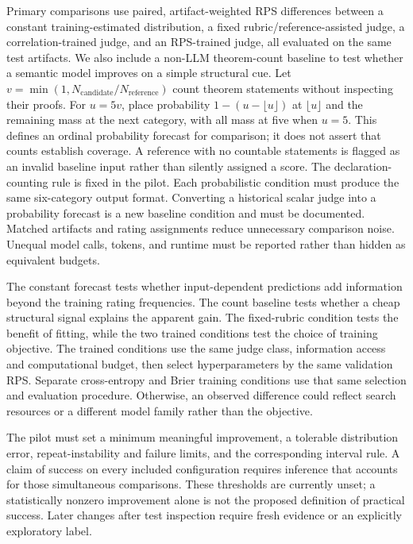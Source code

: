 Primary comparisons use paired, artifact-weighted RPS differences between a constant training-estimated distribution, a fixed rubric/reference-assisted judge, a correlation-trained judge, and an RPS-trained judge, all evaluated on the same test artifacts.
We also include a non-LLM theorem-count baseline to test whether a semantic model improves on a simple structural cue.
Let $v=\min(1,N_{\mathrm{candidate}}/N_{\mathrm{reference}})$ count theorem statements without inspecting their proofs.
For $u=5v$, place probability $1-(u-\lfloor u\rfloor)$ at $\lfloor u\rfloor$ and the remaining mass at the next category, with all mass at five when $u=5$.
This defines an ordinal probability forecast for comparison; it does not assert that counts establish coverage.
A reference with no countable statements is flagged as an invalid baseline input rather than silently assigned a score.
The declaration-counting rule is fixed in the pilot.
Each probabilistic condition must produce the same six-category output format.
Converting a historical scalar judge into a probability forecast is a new baseline condition and must be documented.
Matched artifacts and rating assignments reduce unnecessary comparison noise.
Unequal model calls, tokens, and runtime must be reported rather than hidden as equivalent budgets.

The constant forecast tests whether input-dependent predictions add information beyond the training rating frequencies.
The count baseline tests whether a cheap structural signal explains the apparent gain.
The fixed-rubric condition tests the benefit of fitting, while the two trained conditions test the choice of training objective.
The trained conditions use the same judge class, information access and computational budget, then select hyperparameters by the same validation RPS.
Separate cross-entropy and Brier training conditions use that same selection and evaluation procedure.
Otherwise, an observed difference could reflect search resources or a different model family rather than the objective.

The pilot must set a minimum meaningful improvement, a tolerable distribution error, repeat-instability and failure limits, and the corresponding interval rule.
A claim of success on every included configuration requires inference that accounts for those simultaneous comparisons.
These thresholds are currently unset; a statistically nonzero improvement alone is not the proposed definition of practical success.
Later changes after test inspection require fresh evidence or an explicitly exploratory label.
